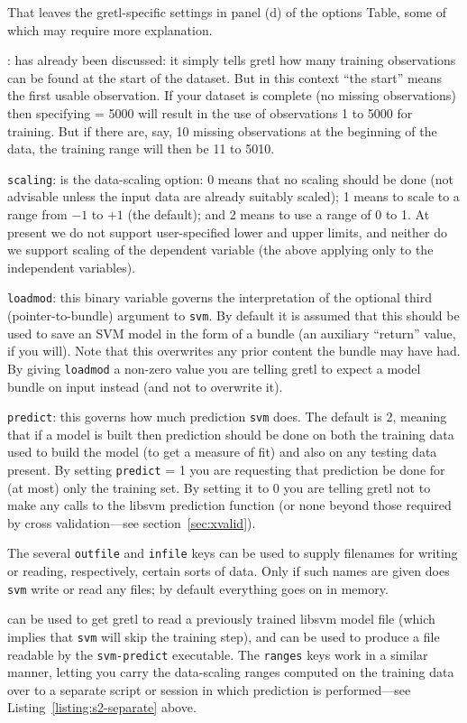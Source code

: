 \documentclass{article}
\begin{document}
That leaves the gretl-specific settings in panel (d) of the options
Table, some of which may require more explanation.

: has already been discussed: it simply tells gretl
how many training observations can be found at the start of the
dataset. But in this context ``the start'' means the first usable
observation. If your dataset is complete (no missing observations)
then specifying  = 5000 will result in the use of
observations 1 to 5000 for training. But if there are, say, 10 missing
observations at the beginning of the data, the training range will
then be 11 to 5010.

\texttt{scaling}: is the data-scaling option: 0 means that no scaling
should be done (not advisable unless the input data are already
suitably scaled); 1 means to scale to a range from $-1$ to $+1$ (the
default); and 2 means to use a range of 0 to 1. At present we do not
support user-specified lower and upper limits, and neither do we
support scaling of the dependent variable (the above applying only to
the independent variables).

\texttt{loadmod}: this binary variable governs the interpretation of
the optional third (pointer-to-bundle) argument to \texttt{svm}. By
default it is assumed that this should be used to save an SVM model in
the form of a bundle (an auxiliary ``return'' value, if you
will). Note that this overwrites any prior content the bundle may have
had. By giving \texttt{loadmod} a non-zero value you are telling gretl
to expect a model bundle on input instead (and not to overwrite it).

\texttt{predict}: this governs how much prediction \texttt{svm} does.
The default is 2, meaning that if a model is built then prediction
should be done on both the training data used to build the model (to get
a measure of fit) and also on any testing data present. By setting
\texttt{predict} = 1 you are requesting that prediction be done for (at
most) only the training set. By setting it to 0 you are telling gretl
not to make any calls to the \textsf{libsvm} prediction function (or
none beyond those required by cross validation---see
section~\ref{sec:xvalid}).

The several \texttt{outfile} and \texttt{infile} keys can be used to
supply filenames for writing or reading, respectively, certain sorts
of data. Only if such names are given does \texttt{svm} write or read
any files; by default everything goes on in memory.

 can be used to get gretl to read a previously
trained \textsf{libsvm} model file (which implies that \texttt{svm}
will skip the training step), and  can be used
to produce a file readable by the \texttt{svm-predict} executable.
The \texttt{ranges} keys work in a similar manner, letting you carry
the data-scaling ranges computed on the training data over to a
separate script or session in which prediction is performed---see
Listing~\ref{listing:s2-separate} above.
\end{document}
